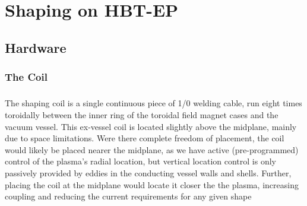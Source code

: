 \chapter{Shaping on HBT-EP}
\section{Hardware}
\subsection{The Coil}
\paragraph{} The shaping coil is a single continuous piece of 1/0 welding cable, run eight times toroidally between the inner ring of the toroidal field magnet cases and the vacuum vessel.  This ex-vessel coil is located slightly above the midplane, mainly due to space limitations.  Were there complete freedom of placement, the coil would likely be placed nearer the midplane, as we have active (pre-programmed) control of the plasma's radial location, but vertical location control is only passively provided by eddies in the conducting vessel walls and shells.  Further, placing the coil at the midplane would locate it closer the the plasma, increasing coupling and reducing the current requirements for any given shape
